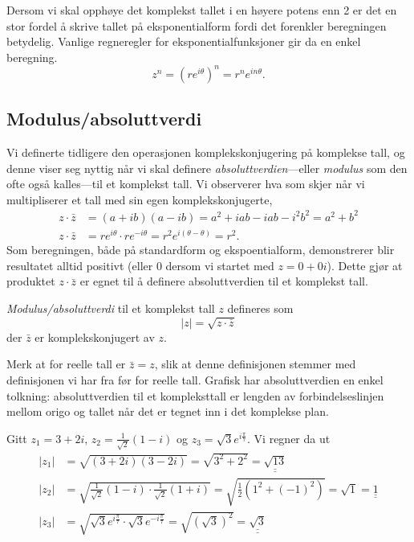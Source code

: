 \documentclass[a4paper,norsk,12pt]{article}
\newcommand{\ans}[1]{\underline{\underline{#1}}}
\newcounter{exa}
\begin{document}
Dersom vi skal opphøye det komplekst tallet i en høyere potens enn 2 er det en stor fordel å skrive tallet på eksponentialform fordi det forenkler beregningen betydelig. Vanlige regneregler for eksponentialfunksjoner gir da en enkel beregning.
\begin{displaymath}
	z^n = \left(re^{i\theta}\right)^n = r^n e^{in\theta}.
\end{displaymath}

\subsection{Modulus/absoluttverdi}
Vi definerte tidligere den operasjonen komplekskonjugering på komplekse tall, og denne viser seg nyttig når vi skal definere \emph{absoluttverdien}---eller \emph{modulus} som den ofte også kalles---til et komplekst tall. Vi observerer hva som skjer når vi multipliserer et tall med sin egen komplekskonjugerte,
\begin{align*}
	z\cdot\bar{z} &= (a + ib)(a-ib) = a^2 + iab - iab -i^2b^2 = a^2 + b^2 \\
	z\cdot\bar{z} &= re^{i\theta}\cdot re^{-i\theta} = r^2e^{i(\theta-\theta)} = r^2.
\end{align*}
Som beregningen, både på standardform og ekspoentialform, demonstrerer blir resultatet alltid positivt (eller 0 dersom vi startet med $z=0+0i$). Dette gjør at produktet $z\cdot\bar{z}$ er egnet til å definere absoluttverdien til et komplekst tall.
\begin{tdef}
\emph{Modulus/absoluttverdi} til et komplekst tall $z$ defineres som
\begin{displaymath}
	|z| = \sqrt{z\cdot\bar{z}}
\end{displaymath}
der $\bar{z}$ er komplekskonjugert av $z$.
\end{tdef}
\noindent
Merk at for reelle tall er $\bar{z}=z$, slik at denne definisjonen stemmer med definisjonen vi har fra før for reelle tall. 
Grafisk har absoluttverdien en enkel tolkning: absoluttverdien til et kompleksttall er lengden av forbindelseslinjen mellom origo og tallet når det er tegnet inn i det komplekse plan.

\begin{texample}
Gitt $z_1 = 3 + 2i$, $z_2 = \frac{1}{\sqrt{2}}(1-i)$ og $z_3 = \sqrt{3}e^{i\frac{\pi}{7}}$. Vi regner da ut
\begin{align*}
	|z_1| &= \sqrt{(3+2i)(3-2i)} = \sqrt{3^2 + 2^2} = \ans{\sqrt{13}}\\[12pt]
	|z_2| &= \sqrt{\frac{1}{\sqrt{2}}(1-i)\cdot\frac{1}{\sqrt{2}}(1+i)} = \sqrt{\frac12 \left(1^2 + (-1)^2\right)} = \sqrt{1} = \ans{1}\\[12pt]
	|z_3| &= \sqrt{\sqrt{3}e^{i\frac{\pi}{7}}\cdot\sqrt{3}e^{-i\frac{\pi}{7}}} = \sqrt{(\sqrt{3})^2} = \ans{\sqrt{3}}
\end{align*}
\end{texample}
\end{document}
